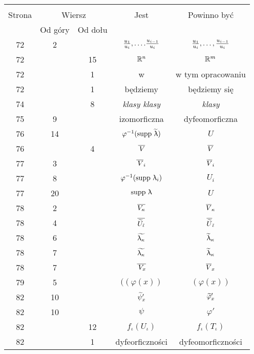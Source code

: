 \documentclass[a4paper,11pt]{article}
\begin{document}
\begin{center}
  \begin{tabular}{|c|c|c|c|c|}
    \hline
    & \multicolumn{2}{c|}{} & & \\
    Strona & \multicolumn{2}{c|}{Wiersz} & Jest
                              & Powinno być \\ \cline{2-3}
    & Od góry & Od dołu & & \\
    \hline
    72  &  2 & & $\frac{ u_{ 1 } }{ u_{ i } }, \ldots. \frac{ u_{ i - 1 } }{ u_{ i } }$
           & $\frac{ u_{ 1 } }{ u_{ i } }, \ldots, \frac{ u_{ i - 1 } }{ u_{ i } }$ \\
    72  & & 15 & $\mathbb{R}^{ n }$ & $\mathbb{R}^{ m }$ \\
    72  & &  1 & w & w tym opracowaniu \\
    72  & &  1 & będziemy & będziemy się \\
    74  & &  8 & \emph{klasy klasy} & \emph{klasy} \\
    75  &  9 & & izomorficzna & dyfeomorficzna \\
    76  & 14 & & $\varphi^{ -1 }( \mathrm{supp}\, \, \widetilde{ \uplambda } )$ & $U$ \\
    76  & &  4 & $\overline{ \, V }$ & $\overline{ V }$ \\
    77  &  3 & & $\overline{\, V }_{ i }$ & $\overline{ V }_{ i }$ \\
    77  &  8 & & $\varphi^{ -1 }( \mathrm{supp}\, \, \uplambda_{ i } )$ & $U_{ i }$ \\
    77  & 20 & & $\mathrm{supp}\, \, \uplambda$ & $U$ \\
    78  &  2 & & $\overline{ V_{ \kappa } }$ & $\overline{ V }_{ \kappa }$ \\
    78  &  4 & & $\overline{ \widetilde{ U }_{ \tilde{ \iota } } }$
           & $\overline{ \widetilde{ U } }_{ \tilde{ \iota } }$ \\
    78  &  6 & & $\widetilde{ \uplambda_{ \kappa } }$ & $\widetilde{ \uplambda }_{ \kappa }$ \\
    78  &  7 & & $\widetilde{ \uplambda_{ \kappa } }$ & $\widetilde{ \uplambda }_{ \kappa }$ \\
    78  &  7 & & $\overline{ \, V_{ x } }$ & $\overline{ V }_{ x }$ \\
    79  &  5 & & $( ( \varphi( x ) )$ & $( \varphi( x ) )$ \\
    82  & 10 & & $\widetilde{ \psi }'_{ x }$
           & $\widetilde{ \varphi }'_{ x }$ \\
    82  & 10 & & $\psi$ & $\varphi'$ \\
    82  & & 12 & $f_{ \iota }( U_{ \iota } )$ & $f_{ \iota }( T_{ \iota } )$ \\
    82  & &  1 & dyfeorficzności & dyfeomorficzności \\

\end{tabular}
\end{center}
\end{document}
